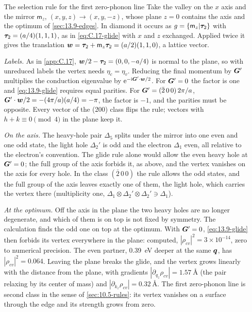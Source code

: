 \begin{workedexample}{The selection rule for the first zero-phonon line}\label{we:13-glide}
Take the valley on the $x$ axis and the mirror $\mathsf{m}_z$, $(x, y, z) \to (x, y, -z)$, whose plane $z = 0$ contains the axis and the optimum of \cref{sec:13.9-edges}. In diamond it occurs as $g = \{\mathsf{m}_z|\bm{\tau}_2\}$ with $\bm{\tau}_2 = (a/4)(1,1,1)$, as in \cref{eq:C.17-glide} with $x$ and $z$ exchanged. Applied twice it gives the translation $\bm{w} = \bm{\tau}_2 + \mathsf{m}_z\bm{\tau}_2 = (a/2)(1,1,0)$, a lattice vector.

\emph{Labels.} As in \cref{app:C.17}, $\bm{w}/2 - \bm{\tau}_2 = (0, 0, -a/4)$ is normal to the plane, so with unreduced labels the vertex needs $\eta_c = \eta_v$. Reducing the final momentum by $\bm{G}'$ multiplies the conduction eigenvalue by $\mathrm{e}^{-\mathrm{i}\bm{G}'\cdot\bm{w}/2}$. For $\bm{G}' = 0$ the factor is one and \cref{eq:13.9-glide} requires equal parities. For $\bm{G}' = (\bar2\,0\,0)\,2\pi/a$, $\bm{G}'\cdot\bm{w}/2 = -(4\pi/a)(a/4) = -\pi$, the factor is $-1$, and the parities must be opposite. Every vector of the (200) class flips the rule; vectors with $h + k \equiv 0 \pmod 4$ in the plane keep it.

\emph{On the axis.} The heavy-hole pair $\Delta_5$ splits under the mirror into one even and one odd state, the light hole $\Delta_2'$ is odd and the electron $\Delta_1$ even, all relative to the electron's convention. The glide rule alone would allow the even heavy hole at $\bm{G}' = 0$; the full group of the axis forbids it, as above, and the vertex vanishes on the axis for every hole. In the class $(\bar2\,0\,0)$ the rule allows the odd states, and the full group of the axis leaves exactly one of them, the light hole, which carries the vertex there (multiplicity one, $\Delta_1\otimes\Delta_2'\otimes\Delta_2' \ni \Delta_1$).

\emph{At the optimum.} Off the axis in the plane the two heavy holes are no longer degenerate, and which of them is on top is not fixed by symmetry. The calculation finds the odd one on top at the optimum. With $\bm{G}' = 0$, \cref{eq:13.9-glide} then forbids its vertex everywhere in the plane: computed, $|\rho_{cv}|^2 = 3\times10^{-14}$, zero to numerical precision. The even partner, \SI{0.39}{eV} deeper at the same $\bm{q}$, has $|\rho_{cv}|^2 = 0.064$. Leaving the plane breaks the glide, and the vertex grows linearly with the distance from the plane, with gradients $|\partial_{q_z}\rho_{cv}| = \SI{1.57}{\angstrom}$ (the pair relaxing by its center of mass) and $|\partial_{k_z}\rho_{cv}| = \SI{0.32}{\angstrom}$. The first zero-phonon line is second class in the sense of \cref{sec:10.5-rules}: its vertex vanishes on a surface through the edge and its strength grows from zero.


\end{workedexample}
